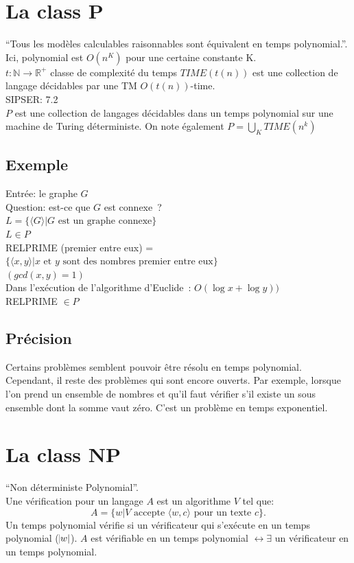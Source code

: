 \documentclass[a4paper,12pt]{article}
\begin{document}
\section{La class P}
  ``Tous les modèles calculables raisonnables sont équivalent en temps polynomial.''.  Ici, polynomial est $O(n^K)$ pour une certaine constante K.\\
  $t: \mathbb{N} \rightarrow \mathbb{R}^+$ classe de complexité du temps $TIME(t(n))$ est une collection de langage décidables par une TM $O(t(n))$-time.\\
  SIPSER: 7.2\\

  $P$ est une collection de langages décidables dans un temps polynomial sur une machine de Turing déterministe. On note également $P = \bigcup_K TIME(n^k)$

  \subsection{Exemple}
    Entrée: le graphe $G$\\
    Question: est-ce que $G$ est connexe~?\\
    $L = \{\langle G\rangle | G \text{ est un graphe connexe}\}$\\
    $L \in P$\\

  RELPRIME (premier entre eux) = $\{\langle x, y\rangle | x \text{ et } y \text{ sont des nombres premier entre eux}\}$\\
  $(gcd(x, y) = 1)$\\
  Dans l'exécution de l'algorithme d'Euclide~: $O(\log x + \log y))$\\
  RELPRIME $\in P$\\
  
  \subsection{Précision}
    Certains problèmes semblent pouvoir être résolu en temps polynomial.  Cependant, il reste des problèmes qui sont encore ouverts. Par exemple, lorsque l'on prend un ensemble de nombres et qu'il faut vérifier s'il existe un sous ensemble dont la somme vaut zéro. C'est un problème en temps exponentiel.

\section{La class NP}
  ``Non déterministe Polynomial''.\\
  Une vérification pour un langage $A$ est un algorithme $V$ tel que:
	\[A = \{w | V \text{ accepte } \langle w, c\rangle \text{ pour un texte } c\}.\]
  Un temps polynomial vérifie si un vérificateur qui s'exécute en un temps polynomial ($\abs w$).
	$A$ est vérifiable en un temps polynomial $\leftrightarrow \exists $ un vérificateur en un temps polynomial.
\end{document}
